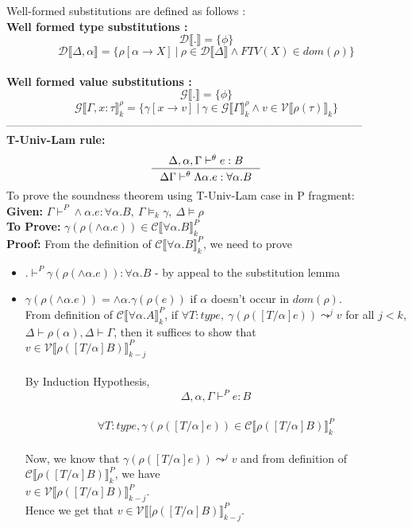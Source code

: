 \documentclass[12pt]{article}
\begin{document}
Well-formed substitutions are defined as follows :\\
\textbf{Well formed type substitutions :}\\
$$
\mathcal{D}\llbracket . \rrbracket = \{\phi\}
$$
$$
\mathcal{D}\llbracket \Delta,\alpha \rrbracket = \{\rho[\alpha \rightarrow X]\ |\
\rho \in \mathcal{D}\llbracket \Delta \rrbracket \wedge FTV(X) \in dom(\rho) \}
$$
\\
\textbf{Well formed value substitutions :}\\
$$
\mathcal{G}\llbracket . \rrbracket = \{\phi\}
$$
$$
\mathcal{G}\llbracket \Gamma , x:\tau \rrbracket^\rho_k = \{\gamma [x
\rightarrow v]\ |\ \gamma \in \mathcal{G}\llbracket \Gamma
\rrbracket^\rho_k \wedge v \in  \mathscr{V} \llbracket \rho(\tau) \rrbracket_k \}
$$
------------------------------------------------------------------------------------------------
\\

\textbf{T-Univ-Lam rule:}\\
$$
\inference{\Delta,\alpha,\Gamma \vdash^{\theta} e:B}{\Delta\Gamma
  \vdash^{\theta} \Lambda \alpha.e:\forall \alpha.B}
$$
To prove the soundness theorem using T-Univ-Lam case in P fragment:\\
\textbf{Given:} $\Gamma \vdash^{P} \wedge \alpha.e : \forall \alpha.B,\
\Gamma \vDash_k  \gamma,\ \Delta \vDash \rho$\\
\textbf{To Prove:} $\gamma(\rho(\wedge\alpha.e)) \in
\mathscr{C}\llbracket \forall \alpha . B \rrbracket_k^{P}$\\
\textbf{Proof:} From the definition of $\mathscr{C}\llbracket \forall
\alpha . B \rrbracket_k^{P}$, we need to prove
\begin{itemize} 
\item $. \vdash^{P} \gamma(\rho(\wedge\alpha.e)) :  \forall \alpha . B$
  - by appeal to the substitution lemma\\
\item $\gamma(\rho(\wedge\alpha.e)) = \wedge\alpha.\gamma(\rho(e))$ if
  $\alpha$ doesn't occur in $dom(\rho)$.\\
From definition of $\mathscr{C} \llbracket \forall \alpha . A
\rrbracket_k^{P} $, if $\forall T:type,\ \gamma(\rho([T/\alpha]e)) \leadsto^j v$ for all $j < k$,
$\Delta \vdash \rho(\alpha), \Delta \vdash \Gamma$, then it suffices to show that\\
$v \in \mathscr{V}\llbracket \rho([T/ \alpha] B)
\rrbracket_{k-j}^{P}$\\
\\
By Induction Hypothesis,\\
$$
\Delta,\alpha,\Gamma \vdash^{P} e:B
$$\\
$$
\forall T:type,\gamma(\rho([T/\alpha]e)) \in
\mathscr{C}\llbracket\rho( [T/\alpha]B ) \rrbracket_k^{P}
$$\\
Now, we know that $\gamma(\rho([T/\alpha]e)) \leadsto^j v$ and from definition of
$\mathscr{C}\llbracket\rho([T/\alpha] B ) \rrbracket_k^{P}$, we have\\
$v \in \mathscr{V}\llbracket \rho([T/ \alpha] B)
\rrbracket_{k-j}^{P}$.\\
Hence we get that $v \in  \mathscr{V}\llbracket [\rho([T/ \alpha] B)
\rrbracket_{k-j}^{P}$.
\end{itemize}
\end{document}
